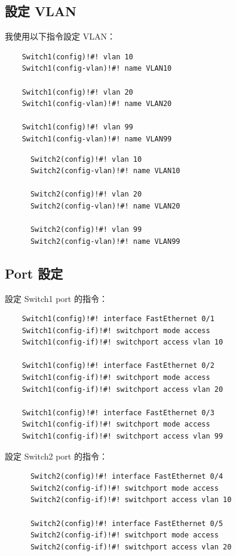 \documentclass[12pt]{article}
\begin{document}
\subsection{設定 VLAN}
我使用以下指令設定 VLAN：
\begin{verbatim}
    Switch1(config)!#! vlan 10
    Switch1(config-vlan)!#! name VLAN10

    Switch1(config)!#! vlan 20
    Switch1(config-vlan)!#! name VLAN20

    Switch1(config)!#! vlan 99
    Switch1(config-vlan)!#! name VLAN99
  \end{verbatim}
    \begin{verbatim}
      Switch2(config)!#! vlan 10
      Switch2(config-vlan)!#! name VLAN10
  
      Switch2(config)!#! vlan 20
      Switch2(config-vlan)!#! name VLAN20
  
      Switch2(config)!#! vlan 99
      Switch2(config-vlan)!#! name VLAN99
    \end{verbatim}

\subsection{Port 設定}
設定 Switch1 port 的指令：
  \begin{verbatim}
    Switch1(config)!#! interface FastEthernet 0/1
    Switch1(config-if)!#! switchport mode access
    Switch1(config-if)!#! switchport access vlan 10

    Switch1(config)!#! interface FastEthernet 0/2
    Switch1(config-if)!#! switchport mode access
    Switch1(config-if)!#! switchport access vlan 20

    Switch1(config)!#! interface FastEthernet 0/3
    Switch1(config-if)!#! switchport mode access
    Switch1(config-if)!#! switchport access vlan 99
  \end{verbatim}
  設定 Switch2 port 的指令：
    \begin{verbatim}
      Switch2(config)!#! interface FastEthernet 0/4
      Switch2(config-if)!#! switchport mode access
      Switch2(config-if)!#! switchport access vlan 10
  
      Switch2(config)!#! interface FastEthernet 0/5
      Switch2(config-if)!#! switchport mode access
      Switch2(config-if)!#! switchport access vlan 20  
    \end{verbatim}
\vspace{-0.5cm}
\end{document}
